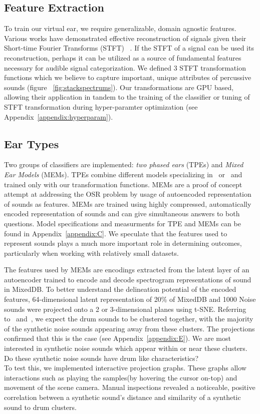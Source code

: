 \documentclass[runningheads,a4paper]{llncs}
\begin{document}
\subsection{Feature Extraction}
To train our virtual ear, we require generalizable, domain agnostic features. Various works have demonstrated effective reconstruction of signals given their Short-time Fourier Transforms (STFT) ~\cite{nawab1983signal,griffin1984signal}. If the STFT of a signal can be used its reconstruction, perhaps it can be utilized as a source of fundamental features necessary for audible signal categorization. We defined 3 STFT transformation functions which we believe to capture important, unique attributes of percussive sounds (figure ~\ref{fig:stackspectrums}). Our transformations are GPU based, allowing their application in tandem to the training of the classifier or tuning of STFT transformation during hyper-paramter optimization (see Appendix~\ref{appendix:hyperparam}).
\subsection{Ear Types}
\label{classifiers}

Two groups of classifiers are implemented: \emph{two phased ears} (TPEs) and \emph{Mixed Ear Models} (MEMs). TPEs combine different models specializing in~ or~ and trained only with our transformation functions. MEMs are a proof of concept attempt at addressing the OSR problem by usage of autoencoded representation of sounds as features. MEMs are trained using highly compressed, automatically encoded representation of sounds and can give simultaneous answers to both questions. Model specifications and measurments for TPE and MEMs can be found in Appendix~\ref{appendix:C}. We speculate that the features used to represent sounds plays a much more important role in determining outcomes, particularly when working with relatively small datasets. 

The features used by MEMs are encodings extracted from the latent layer of an autoencoder trained to encode and decode spectrogram representations of sound in MixedDB. To better understand the delineation potential of the encoded features, 64-dimensional latent representation of 20\% of MixedDB and 1000 Noise sounds were projected onto a 2 or 3-dimensional planes using t-SNE. Referring to~ and~, we expect the drum sounds to be clustered together, with the majority of the synthetic noise sounds appearing away from these clusters. The projections confirmed that this is the case (see Appendix~\ref{appendix:E}). We are most interested in synthetic noise sounds which appear within or near these clusters. Do these synthetic noise sounds have drum like characteristics?\\ 
To test this, we implemented interactive projection graphs. These graphs allow interactions such as playing the samples(by hovering the cursor on-top) and movement of the scene camera. Manual inspections revealed a noticeable, positive correlation between a synthetic sound's distance and similarity of a synthetic sound to drum clusters.
\end{document}
